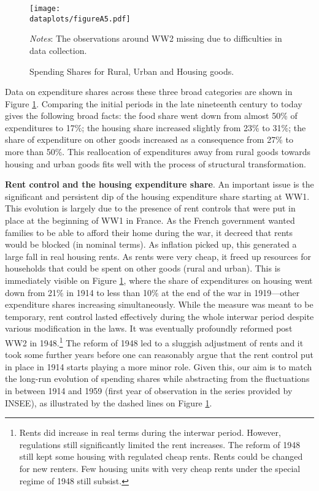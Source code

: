\documentclass[11pt]{report}
\newcommand{\dataplots}{../output/data/plots}
\begin{document}
\begin{figure}[h]
	\begin{center}
		\texttt{[image: \\dataplots/figureA5.pdf]}
	\end{center}
	\vspace{-0.5cm}
	\caption{Spending Shares for Rural, Urban and Housing goods.}
	\label{A-fig:spending-data}
	{\footnotesize \textit{Notes}: The observations around WW2 missing due to difficulties in data collection.}
	
\end{figure}

Data on expenditure shares across these three broad categories are shown in Figure \ref{A-fig:spending-data}. Comparing the initial periods in the late nineteenth century to today gives the following broad facts: the food share went down from almost 50\% of expenditures to 17\%; the housing share increased slightly from 23\% to 31\%; the share of expenditure on other goods increased as a consequence from 27\% to more than 50\%. This reallocation of expenditures away from rural goods towards housing and urban goods fits well with the process of structural transformation.  



\noindent \textbf{Rent control and the housing expenditure share}. An important issue is the significant and persistent dip of the housing expenditure share starting at WW1. This evolution is largely due to the presence of rent controls that were put in place at the beginning of WW1 in France. As the French government wanted families to be able to afford their home during the war, it decreed that rents would be blocked (in nominal terms). As inflation picked up, this generated a large fall in real housing rents. As rents were very cheap, it freed up resources for households that could be spent on other goods (rural and urban). This is immediately visible on Figure \ref{A-fig:spending-data}, where the share of expenditures on housing went down from 21\% in 1914 to less than 10\% at the end of the war in 1919---other expenditure shares increasing simultaneously. While the measure was meant to be temporary, rent control lasted effectively during the whole interwar period despite various modification in the laws. It was eventually profoundly reformed post WW2 in 1948.\footnote{Rents did increase in real terms during the interwar period. However, regulations still significantly limited the rent increases. The reform of 1948 still kept some housing with regulated cheap rents. Rents could be changed for new renters. Few housing units with very cheap rents under the special regime of 1948 still subsist.} The reform of 1948 led to a sluggish adjustment of rents and it took some further years before one can reasonably argue that the rent control put in place in 1914 starts playing a more minor role. Given this, our aim is to match the long-run evolution of spending shares while abstracting from the fluctuations in between 1914 and 1959 (first year of observation in the series provided by INSEE), as illustrated by the dashed lines on Figure \ref{A-fig:spending-data}.
\end{document}
